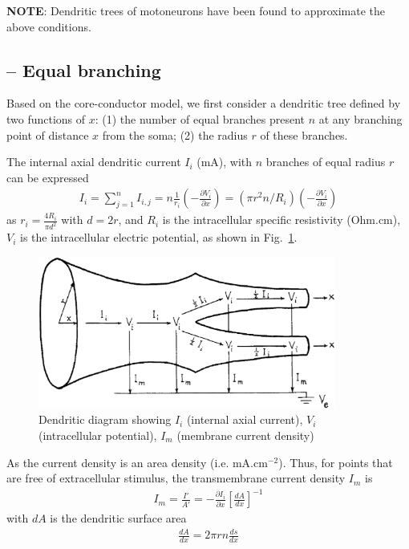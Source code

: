 {\bf NOTE}: Dendritic trees of motoneurons have been found to
approximate the above conditions. 



\subsection{-- Equal branching}
\label{sec:equal-branching}

Based on the core-conductor model, we first consider a dendritic tree
defined by two functions of $x$: (1) the number of equal branches
present $n$ at any branching point of distance $x$ from the soma; (2)
the radius $r$ of these branches.

The internal axial dendritic current $I_i$ (mA), with $n$ branches of
equal radius $r$ can be expressed
\begin{eqnarray}
  \label{eq:482}
  I_i = \sum_{j=1}^n I_{i,j}= n \frac{1}{r_i}\left(-\frac{\partial
      V_i}{\partial x}\right) = (\pi r^2 n/R_i) \left( - \frac{\partial V_i}{\partial x} \right)
\end{eqnarray}
as $r_i = \frac{4R_i}{\pi d^2}$ with $d=2r$, and $R_i$ is the
intracellular specific resistivity (Ohm.cm), $V_i$ is the
intracellular electric potential, as shown in
Fig.~\ref{fig:current_i}.
\begin{figure}[hbt]
  \centerline{\includegraphics[height=5cm,
    angle=0]{./images/dendritic_branch.eps}}
\caption{Dendritic diagram showing $I_i$ (internal axial current),
  $V_i$ (intracellular potential), $I_m$ (membrane current density)}
\label{fig:current_i}
\end{figure}

As the current density is an area density (i.e. mA.cm$^{-2}$). Thus, %
for points that are free of extracellular stimulus, the transmembrane
current density $I_m$ is
\begin{eqnarray}
  \label{eq:513}
    I_m = \frac{I'}{A'}= -\frac{\partial I_i}{\partial x}\left[ \frac{dA}{dx}\right]^{-1}
\end{eqnarray}
with $dA$ is the dendritic surface area
\begin{eqnarray}
  \label{eq:488}
  \frac{dA}{dx} = 2\pi rn \frac{ds}{dx}
\end{eqnarray}

